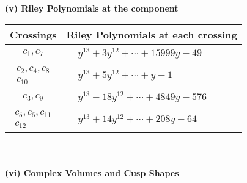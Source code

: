 \documentclass[1p]{elsarticle_modified}
\theoremstyle{definition}
\begin{document}
\newpage\renewcommand{\arraystretch}{1}
\flushleft \textbf{(v) Riley Polynomials at the component}\newline \\
\begin{tabular}{m{50pt}|m{274pt}}
Crossings & \hspace{64pt}Riley Polynomials at each crossing \\
\hline $$\begin{aligned}c_{1},c_{7}\end{aligned}$$&$\begin{aligned}
&y^{13}+3 y^{12}+\cdots+15999 y-49
\end{aligned}$\\
\hline $$\begin{aligned}c_{2},c_{4},c_{8}\\c_{10}\end{aligned}$$&$\begin{aligned}
&y^{13}+5 y^{12}+\cdots+y-1
\end{aligned}$\\
\hline $$\begin{aligned}c_{3},c_{9}\end{aligned}$$&$\begin{aligned}
&y^{13}-18 y^{12}+\cdots+4849 y-576
\end{aligned}$\\
\hline $$\begin{aligned}c_{5},c_{6},c_{11}\\c_{12}\end{aligned}$$&$\begin{aligned}
&y^{13}+14 y^{12}+\cdots+208 y-64
\end{aligned}$\\
\hline
\end{tabular}\\~\\
\newpage\flushleft \textbf{(vi) Complex Volumes and Cusp Shapes}
\end{document}
